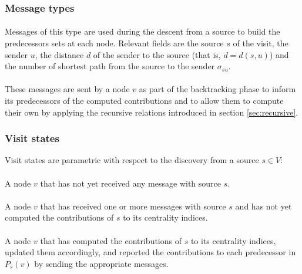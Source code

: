 \subsubsection{Message types}

\paragraph{} Messages of this type are used during the descent from a source to build the predecessors sets at each node. Relevant fields are the source $s$ of the visit, the sender $u$, the distance $d$ of the sender to the source (that is, $d = d(s,u)$) and the number of shortest path from the source to the sender $\sigma_{su}$.

\paragraph{} These messages are sent by a node $v$ as part of the backtracking phase to inform its predecessors of the computed contributions and to allow them to compute their own by applying the recursive relations introduced in section \ref{sec:recursive}.

\subsubsection{Visit states}

Visit states are parametric with respect to the discovery from a source $s \in V$:

\paragraph{} A node $v$ that has not yet received any \mdisc{} message with source $s$.


\paragraph{} A node $v$ that has received one or more \mdisc{} messages with source $s$ and has not yet computed the contributions of $s$ to its centrality indices.


\paragraph{} A node $v$ that has computed the contributions of $s$ to its centrality indices, updated them accordingly, and reported the contributions to each predecessor in $P_s(v)$ by sending the appropriate \mrep{} messages.

